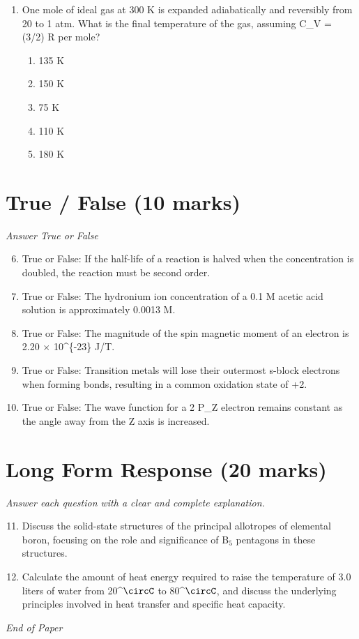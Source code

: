 \documentclass[12pt]{article}
\begin{document}
\begin{enumerate}[label=\arabic*.]
\begin{enumerate}[label=(\alph*)]
    \item 13.00987 amu
    \item 13.00335 amu
    \item 13.00739 amu
\end{enumerate}
\item One mole of ideal gas at 300 K is expanded adiabatically and reversibly from 20 to 1 atm. What is the final temperature of the gas, assuming C\_V = (3/2) R per mole?
\begin{enumerate}[label=(\alph*)]
    \item 135 K
    \item 150 K
    \item 75 K
    \item 110 K
    \item 180 K
\end{enumerate}
\end{enumerate}

\section*{True / False (10 marks)}
\textit{Answer True or False}
\begin{enumerate}[label=\arabic*.]
\setcounter{enumi}{5}
\item True or False: If the half-life of a reaction is halved when the concentration is doubled, the reaction must be second order.
\item True or False: The hydronium ion concentration of a 0.1 M acetic acid solution is approximately 0.0013 M.
\item True or False: The magnitude of the spin magnetic moment of an electron is 2.20 \ensuremath{\times} 10^\{-23\} J/T.
\item True or False: Transition metals will lose their outermost s-block electrons when forming bonds, resulting in a common oxidation state of +2.
\item True or False: The wave function for a 2 P\_Z electron remains constant as the angle away from the Z axis is increased.
\end{enumerate}

\section*{Long Form Response (20 marks)}
\textit{Answer each question with a clear and complete explanation.}
\begin{enumerate}[label=\arabic*.]
\setcounter{enumi}{10}
\item Discuss the solid-state structures of the principal allotropes of elemental boron, focusing on the role and significance of B$_{5}$ pentagons in these structures.
\item Calculate the amount of heat energy required to raise the temperature of 3.0 liters of water from 20^\ensuremath{\circC} to 80^\ensuremath{\circC}, and discuss the underlying principles involved in heat transfer and specific heat capacity.
\end{enumerate}

\vfill
\noindent\textit{End of Paper}
\end{document}
